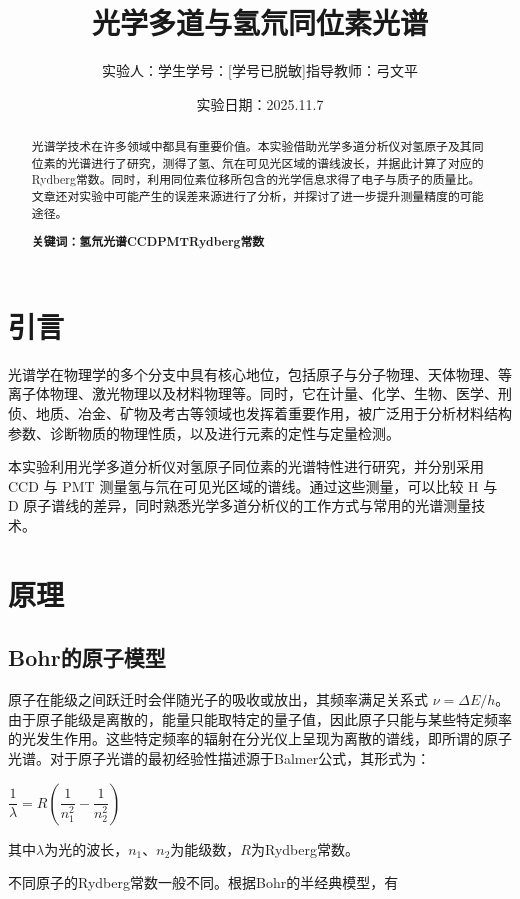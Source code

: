 \documentclass[a4paper, 1.5lines]{ctexart}
\title{光学多道与氢氘同位素光谱}
\author{实验人：学生\qquad 学号：[学号已脱敏]\qquad 指导教师：弓文平}
\date{实验日期：2025.11.7}
\begin{document}
    
    \maketitle
    
    \begin{abstract}
         光谱学技术在许多领域中都具有重要价值。本实验借助光学多道分析仪对氢原子及其同位素的光谱进行了研究，测得了氢、氘在可见光区域的谱线波长，并据此计算了对应的Rydberg常数。同时，利用同位素位移所包含的光学信息求得了电子与质子的质量比。文章还对实验中可能产生的误差来源进行了分析，并探讨了进一步提升测量精度的可能途径。

         \textbf{\textbf{关键词：氢氘光谱\quad CCD\quad PMT\quad Rydberg常数}}
    \end{abstract}
    
    \section{引言}
       光谱学在物理学的多个分支中具有核心地位，包括原子与分子物理、天体物理、等离子体物理、激光物理以及材料物理等。同时，它在计量、化学、生物、医学、刑侦、地质、冶金、矿物及考古等领域也发挥着重要作用，被广泛用于分析材料结构参数、诊断物质的物理性质，以及进行元素的定性与定量检测。

本实验利用光学多道分析仪对氢原子同位素的光谱特性进行研究，并分别采用 CCD 与 PMT 测量氢与氘在可见光区域的谱线。通过这些测量，可以比较 H 与 D 原子谱线的差异，同时熟悉光学多道分析仪的工作方式与常用的光谱测量技术。

    \section{原理}
        \subsection{Bohr的原子模型}
       原子在能级之间跃迁时会伴随光子的吸收或放出，其频率满足关系式 $\nu = \Delta E / h$。由于原子能级是离散的，能量只能取特定的量子值，因此原子只能与某些特定频率的光发生作用。这些特定频率的辐射在分光仪上呈现为离散的谱线，即所谓的原子光谱。对于原子光谱的最初经验性描述源于Balmer公式，其形式为：
            
        \centerline{$\dfrac{1}{\lambda} = R \left(\dfrac{1}{n_1^2} - \dfrac{1}{n_2^2}\right)$}

        其中$\lambda$为光的波长，$n_1$、$n_2$为能级数，$R$为Rydberg常数。

        不同原子的Rydberg常数一般不同。根据Bohr的半经典模型，有
\end{document}
